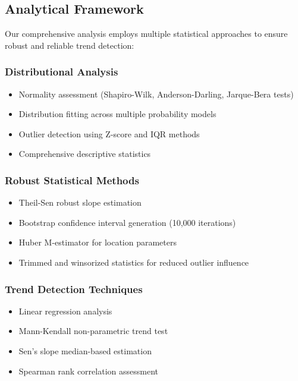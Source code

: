 \documentclass[12pt,a4paper]{article}
\begin{document}
\subsection{Analytical Framework}

Our comprehensive analysis employs multiple statistical approaches to ensure robust and reliable trend detection:

\subsubsection{Distributional Analysis}
\begin{itemize}
    \item Normality assessment (Shapiro-Wilk, Anderson-Darling, Jarque-Bera tests)
    \item Distribution fitting across multiple probability models
    \item Outlier detection using Z-score and IQR methods
    \item Comprehensive descriptive statistics
\end{itemize}

\subsubsection{Robust Statistical Methods}
\begin{itemize}
    \item Theil-Sen robust slope estimation
    \item Bootstrap confidence interval generation (10,000 iterations)
    \item Huber M-estimator for location parameters
    \item Trimmed and winsorized statistics for reduced outlier influence
\end{itemize}

\subsubsection{Trend Detection Techniques}
\begin{itemize}
    \item Linear regression analysis
    \item Mann-Kendall non-parametric trend test
    \item Sen's slope median-based estimation
    \item Spearman rank correlation assessment
\end{itemize}
\end{document}
